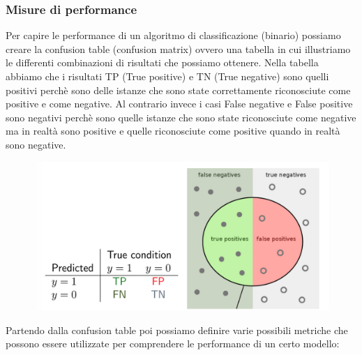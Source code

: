 \documentclass[14pt]{extreport}
\begin{document}
\subsubsection{Misure di performance}

Per capire le performance di un algoritmo di classificazione (binario) possiamo creare la confusion table (confusion matrix) ovvero una tabella in cui
illustriamo le differenti combinazioni di risultati che possiamo ottenere. Nella tabella abbiamo che i risultati TP (True positive) e TN (True
negative) sono quelli positivi perchè sono delle istanze che sono state correttamente riconosciute come positive e come negative. Al contrario invece
i casi False negative e False positive sono negativi perchè sono quelle istanze che sono state riconosciute come negative ma in realtà sono positive e
quelle riconosciute come positive quando in realtà sono negative.



\begin{figure}[H]
	\centering
	\includegraphics[width=0.7\linewidth]{456.jpeg}
\end{figure}

Partendo dalla confusion table poi possiamo definire varie possibili metriche che possono essere utilizzate per comprendere le performance di un certo
modello:
\end{document}
